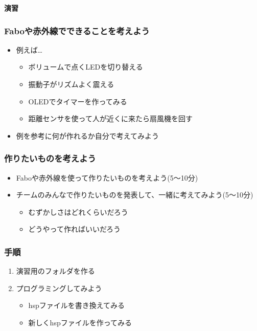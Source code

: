 \begin{frame}[plain]
    \begin{center}
        \vspace{48pt}
        {\huge\bf 演習}
    \end{center}
\end{frame}

\begin{frame}[fragile]
    \frametitle{Faboや赤外線でできることを考えよう}
    \begin{center}
        \begin{itemize}
            \item 例えば\dots
            \begin{itemize}
                \item ボリュームで点くLEDを切り替える
                \item 振動子がリズムよく震える
                \item OLEDでタイマーを作ってみる
                \item 距離センサを使って人が近くに来たら扇風機を回す
            \end{itemize}
            \item 例を参考に何が作れるか自分で考えてみよう
        \end{itemize}
    \end{center}
\end{frame}

\begin{frame}[fragile]
    \frametitle{作りたいものを考えよう}
    \begin{center}
        \begin{itemize}
            \item Faboや赤外線を使って作りたいものを考えよう(5〜10分)
            \item チームのみんなで作りたいものを発表して、一緒に考えてみよう(5〜10分)
            \begin{itemize}
                \item むずかしさはどれくらいだろう
                \item どうやって作ればいいだろう
            \end{itemize}
        \end{itemize}
    \end{center}
\end{frame}

\begin{frame}[fragile]
    \frametitle{手順}
    \begin{center}
        \begin{enumerate}
            \item 演習用のフォルダを作る
            \item プログラミングしてみよう
            \begin{itemize}
                \item hspファイルを書き換えてみる
                \item 新しくhspファイルを作ってみる
            \end{itemize}
        \end{enumerate}
    \end{center}
\end{frame}

